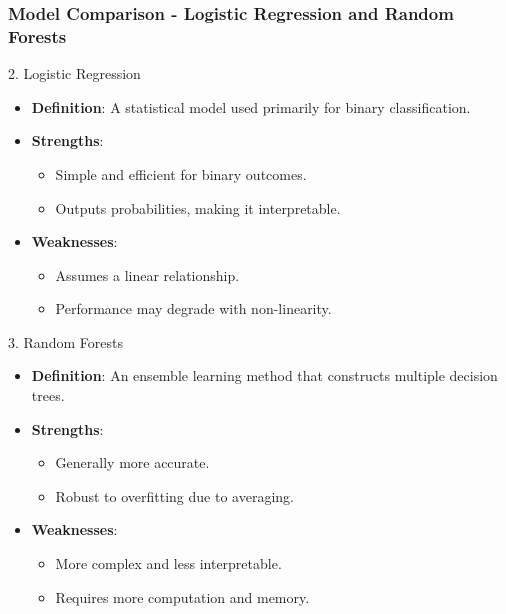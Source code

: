 \documentclass[aspectratio=169]{beamer}
\begin{document}
\begin{frame}[fragile]
    \frametitle{Model Comparison - Logistic Regression and Random Forests}

    \begin{block}{2. Logistic Regression}
        \begin{itemize}
            \item \textbf{Definition}: A statistical model used primarily for binary classification.
            \item \textbf{Strengths}:
                \begin{itemize}
                    \item Simple and efficient for binary outcomes.
                    \item Outputs probabilities, making it interpretable.
                \end{itemize}
            \item \textbf{Weaknesses}:
                \begin{itemize}
                    \item Assumes a linear relationship.
                    \item Performance may degrade with non-linearity.
                \end{itemize}
        \end{itemize}
    \end{block}

    \begin{block}{3. Random Forests}
        \begin{itemize}
            \item \textbf{Definition}: An ensemble learning method that constructs multiple decision trees.
            \item \textbf{Strengths}:
                \begin{itemize}
                    \item Generally more accurate.
                    \item Robust to overfitting due to averaging.
                \end{itemize}
            \item \textbf{Weaknesses}:
                \begin{itemize}
                    \item More complex and less interpretable.
                    \item Requires more computation and memory.
                \end{itemize}
        \end{itemize}
    \end{block}
\end{frame}
\end{document}
